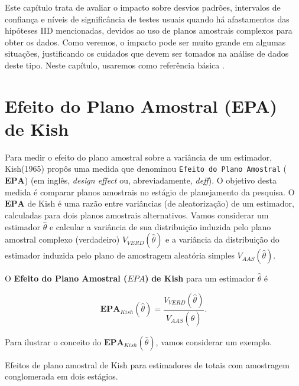 \documentclass[]{book}
\theoremstyle{definition}
\theoremstyle{definition}
\theoremstyle{definition}
\theoremstyle{remark}
\let\BeginKnitrBlock\begin \let\EndKnitrBlock\end
\begin{document}
Este capítulo trata de avaliar o impacto sobre desvios padrões,
intervalos de confiança e níveis de significância de testes usuais
quando há afastamentos das hipóteses IID mencionadas, devidos ao uso de
planos amostrais complexos para obter os dados. Como veremos, o impacto
pode ser muito grande em algumas situações, justificando os cuidados que
devem ser tomados na análise de dados deste tipo. Neste capítulo,
usaremos como referência básica \citep{Sk89a}.

\section{Efeito do Plano Amostral (EPA) de
Kish}\label{efeito-do-plano-amostral-epa-de-kish}

Para medir o efeito do plano amostral sobre a variância de um estimador,
Kish(1965) propôs uma medida que denominou
\texttt{Efeito\ do\ Plano\ Amostral} (\(\mathbf{EPA}\)) (em inglês,
\emph{design effect} ou, abreviadamente, \emph{deff}). O objetivo desta
medida é comparar planos amostrais no estágio de planejamento da
pesquisa. O \(\mathbf{EPA}\) de Kish é uma razão entre variâncias (de
aleatorização) de um estimador, calculadas para dois planos amostrais
alternativos. Vamos considerar um estimador \(\hat{\theta}\) e calcular
a variância de sua distribuição induzida pelo plano amostral complexo
(verdadeiro) \(V_{VERD}\left( \hat{\theta}\right)\) e a variância da
distribuição do estimador induzida pelo plano de amostragem aleatória
simples \(V_{AAS}\left(\hat{\theta}\right)\).

\BeginKnitrBlock{definition}
\protect\hypertarget{def:unnamed-chunk-1}{}{\label{def:unnamed-chunk-1} }O
\textbf{Efeito do Plano Amostral (\(EPA\))} \textbf{de Kish} para um
estimador \(\hat{\theta}\) é
\EndKnitrBlock{definition}

\begin{equation}
\mathbf{EPA}_{Kish}\left( \hat{\theta}\right) =\frac{V_{VERD}\left( \hat{\theta}\right) }{V_{AAS}\left( \hat{\theta}\right) }. \label{eq:epa1} \end{equation}

Para ilustrar o conceito do
\(\mathbf{EPA}_{Kish}\left( \hat{\theta}\right)\), vamos considerar um
exemplo.

\BeginKnitrBlock{example}
\protect\hypertarget{exm:epakish}{}{\label{exm:epakish} }Efeitos de plano
amostral de Kish para estimadores de totais com amostragem conglomerada
em dois estágios.
\EndKnitrBlock{example}
\end{document}
